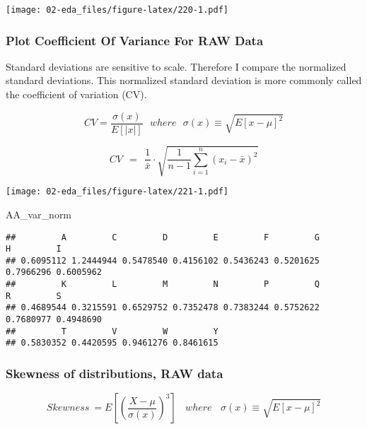 \documentclass[]{article}
\newenvironment{Shaded}{\begin{snugshade}}{\end{snugshade}}
\newcommand{\NormalTok}[1]{#1}
\begin{document}
\texttt{[image: 02-eda\_files/figure-latex/220-1.pdf]}

\hypertarget{plot-coefficient-of-variance-for-raw-data}{%
\subsubsection{Plot Coefficient Of Variance For RAW
Data}\label{plot-coefficient-of-variance-for-raw-data}}

Standard deviations are sensitive to scale. Therefore I compare the
normalized standard deviations. This normalized standard deviation is
more commonly called the coefficient of variation (CV).

\begin{equation} 
CV = \frac {\sigma (x)} {E [|x|]} ~~~ where ~~~ \sigma(x) \equiv \sqrt{ E[x - \mu]^2 }
\end{equation}

\begin{equation} 
CV ~~=~~ \frac{1}{\bar x} \cdot \sqrt{ \frac{1}{n-1} \sum^n_{i=1} (x_i - \bar x)^2}
\end{equation}

\texttt{[image: 02-eda\_files/figure-latex/221-1.pdf]}

\begin{Shaded}
\begin{Highlighting}[]
\NormalTok{AA_var_norm}
\end{Highlighting}
\end{Shaded}

\begin{verbatim}
##         A         C         D         E         F         G         H         I 
## 0.6095112 1.2444944 0.5478540 0.4156102 0.5436243 0.5201625 0.7966296 0.6005962 
##         K         L         M         N         P         Q         R         S 
## 0.4689544 0.3215591 0.6529752 0.7352478 0.7383244 0.5752622 0.7680977 0.4948690 
##         T         V         W         Y 
## 0.5830352 0.4420595 0.9461276 0.8461615
\end{verbatim}

\newpage

\hypertarget{skewness-of-distributions-raw-data}{%
\subsubsection{Skewness of distributions, RAW
data}\label{skewness-of-distributions-raw-data}}

\begin{equation} 
Skewness ~= E\left[ \left( \frac{X - \mu}{\sigma(x)} \right)^3 \right] ~~~~ where ~~~~ \sigma(x) \equiv \sqrt{ E[x - \mu]^2 }
\end{equation}
\end{document}
